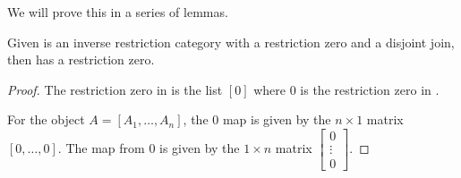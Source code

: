 We will prove this in a series of lemmas.

\begin{lemma}\label{lem:imat_has_restriction_zero}
  Given \X is an inverse restriction category with a restriction zero and a disjoint join,
  then \imatx has a restriction zero.
\end{lemma}
\begin{proof}
  The restriction zero in \imatx is the list $[0]$ where $0$ is the restriction zero in \X.

  For the object $A=[A_1,\ldots,A_n]$, the $0$ map is given by the $n\times 1$ matrix
  $[0,\ldots,0]$. The map from $0$ is given by the $1\times n$ matrix
  $\begin{bmatrix}0\\ \vdots\\ 0\end{bmatrix}$.

\end{proof}

